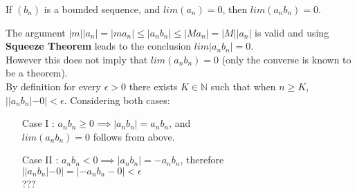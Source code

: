 \documentclass[boxes, qed]{homework}
\begin{document}
\newenvironment{amatrix}[1]{%
  \left[\begin{array}{@{}*{#1}{c}|c@{}}
}{%
  \end{array}\right]
}

\newenvironment{augmatrix}[1]{%
  \left[\begin{array}{#1}
}{%
  \end{array}\right]
}

\begin{problem}If $(b_n)$ is a bounded sequence, and $lim(a_n)=0$,
  then $lim(a_nb_n)=0$.
\end{problem}
\begin{solution}The argument $|m||a_n|=|ma_n|\le|a_n{b_n}|\le|M a_n|=|M||a_n|$
  is valid and using \textbf{Squeeze Theorem} leads to the conclusion $lim|a_n{b_n}|=0$.\\

  However this does not imply that $lim(a_n{b_n})=0$ (only the converse is known to be a theorem).\\

  By definition for every $\epsilon>0$ there exists $K\in{\mathbb{N}}$ such that
  when $n\ge{K}$, $||a_nb_n|-0|<\epsilon$.
  Considering both cases:
  \begin{enumerate}
    \item[Case I]: $a_n{b_n}\ge{0}
    \implies |a_n{b_n}| = a_n{b_n}$, and\\
    $lim(a_nb_n)=0$ follows from above.
    \item[Case II]: $a_n{b_n}<{0}
    \implies |a_n{b_n}| = -a_n{b_n}$, therefore\\
    $||a_nb_n|-0|=|-a_nb_n-0|<\epsilon$\\
    ???
  \end{enumerate}
\end{solution}
\end{document}
